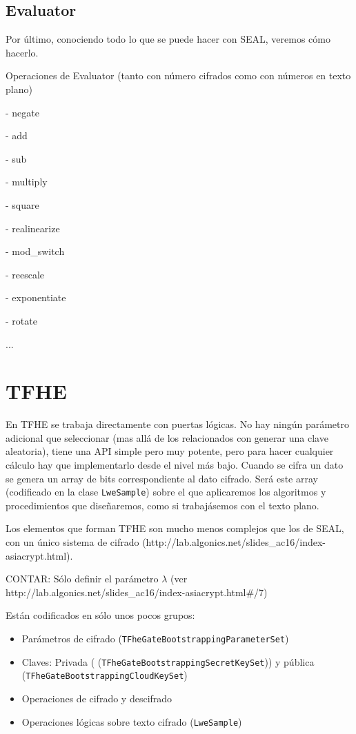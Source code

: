 \subsection{Evaluator}

Por último, conociendo todo lo que se puede hacer con SEAL, veremos cómo hacerlo.

Operaciones de Evaluator (tanto con número cifrados como con números en texto plano)

- negate

- add

- sub

- multiply

- square

- realinearize

- mod\_switch

- reescale

- exponentiate

- rotate

...


\section{TFHE}

En TFHE se trabaja directamente con puertas lógicas. No hay ningún parámetro adicional que seleccionar (mas allá de los relacionados con generar una clave aleatoria), tiene una API simple pero muy potente, pero para hacer cualquier cálculo hay que implementarlo desde el nivel más bajo. Cuando se cifra un dato se genera un array de bits correspondiente al dato cifrado. Será este array (codificado en la clase \verb|LweSample|) sobre el que aplicaremos los algoritmos y procedimientos que diseñaremos, como si trabajásemos con el texto plano.

Los elementos que forman TFHE son mucho menos complejos que los de SEAL, con un único sistema de cifrado (http://lab.algonics.net/slides_ac16/index-asiacrypt.html).

CONTAR: Sólo definir el parámetro $\lambda$ (ver http://lab.algonics.net/slides_ac16/index-asiacrypt.html#/7)

Están codificados en sólo unos pocos grupos:

\begin{itemize}
  \item Parámetros de cifrado (\texttt{TFheGateBootstrappingParameterSet})
  \item Claves: Privada ( (\texttt{TFheGateBootstrappingSecretKeySet})) y pública (\texttt{TFheGateBootstrappingCloudKeySet})
  \item Operaciones de cifrado y descifrado
  \item Operaciones lógicas sobre texto cifrado (\texttt{LweSample})
\end{itemize}

